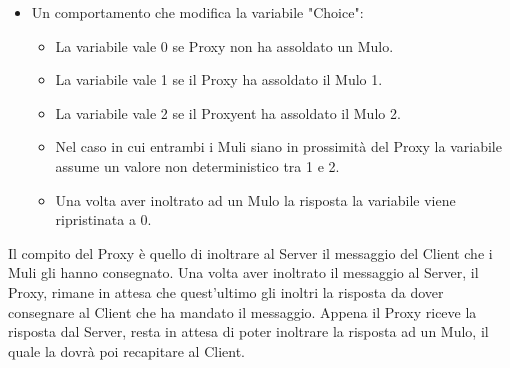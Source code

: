 \documentclass[13pt,a4paper]{article}
\begin{document}
\begin{itemize}
\begin{itemize}
\begin{itemize}
		\end{itemize}
		\item Un comportamento che modifica la variabile "Choice":
		\begin{itemize}
			\item La variabile vale 0 se Proxy non ha assoldato un Mulo.
			\item La variabile vale 1 se  il Proxy ha assoldato il Mulo 1.
			\item La variabile vale 2 se  il Proxyent ha assoldato il Mulo 2.
			\item Nel caso in cui entrambi i Muli siano in prossimità del Proxy la variabile assume un valore non deterministico tra 1 e 2.
			\item Una volta aver inoltrato ad un Mulo la risposta la variabile viene ripristinata a 0.
		\end{itemize}
	\end{itemize}
	Il compito del Proxy è quello di inoltrare al Server il messaggio del Client che i Muli gli hanno consegnato. Una volta aver inoltrato il messaggio al Server, il Proxy, rimane in attesa che quest'ultimo gli inoltri la risposta da dover consegnare al Client che ha mandato il messaggio. Appena il Proxy riceve la risposta dal Server, resta in attesa di poter inoltrare la risposta ad un Mulo, il quale la dovrà poi recapitare al Client.
	

\end{itemize}
\end{document}
